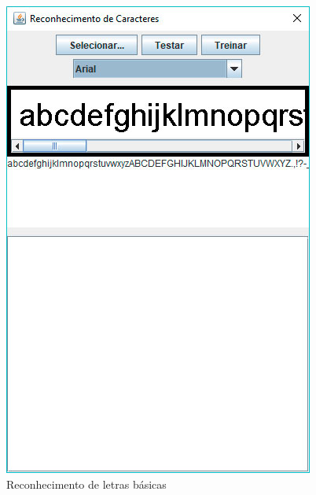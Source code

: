 \begin{figure}[!htb]
	\centering
	\includegraphics[scale=0.5]{img/01-reconhecimento-letras-basicas.jpg}
	\caption{Reconhecimento de letras básicas}
	\label{Reconhecimento}
\end{figure}